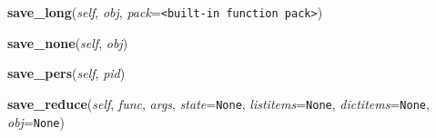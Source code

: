     \label{pickle:Pickler:save_long}

    \vspace{0.5ex}

\hspace{.8\funcindent}\begin{boxedminipage}{\funcwidth}

    \raggedright \textbf{save\_long}(\textit{self}, \textit{obj}, \textit{pack}={\tt {\textless}built-in function pack{\textgreater}})

\setlength{\parskip}{2ex}
\setlength{\parskip}{1ex}
    \end{boxedminipage}

    \label{pickle:Pickler:save_none}

    \vspace{0.5ex}

\hspace{.8\funcindent}\begin{boxedminipage}{\funcwidth}

    \raggedright \textbf{save\_none}(\textit{self}, \textit{obj})

\setlength{\parskip}{2ex}
\setlength{\parskip}{1ex}
    \end{boxedminipage}

    \label{pickle:Pickler:save_pers}

    \vspace{0.5ex}

\hspace{.8\funcindent}\begin{boxedminipage}{\funcwidth}

    \raggedright \textbf{save\_pers}(\textit{self}, \textit{pid})

\setlength{\parskip}{2ex}
\setlength{\parskip}{1ex}
    \end{boxedminipage}

    \label{pickle:Pickler:save_reduce}

    \vspace{0.5ex}

\hspace{.8\funcindent}\begin{boxedminipage}{\funcwidth}

    \raggedright \textbf{save\_reduce}(\textit{self}, \textit{func}, \textit{args}, \textit{state}={\tt None}, \textit{listitems}={\tt None}, \textit{dictitems}={\tt None}, \textit{obj}={\tt None})

\setlength{\parskip}{2ex}
\setlength{\parskip}{1ex}
    \end{boxedminipage}

